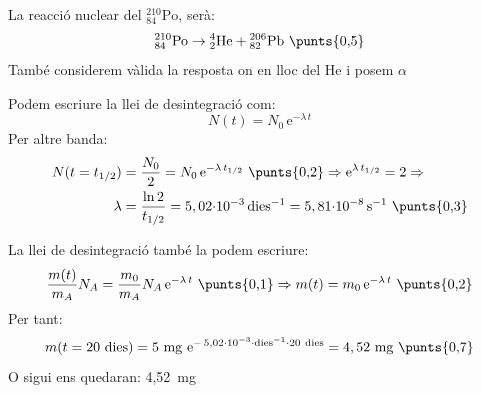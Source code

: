 \begin{solapartat}
La reacció nuclear del ${}^{210}_{84}\mathrm{Po}$, serà:
\[ {}^{210}_{84}\mathrm{Po} \rightarrow {}^{4}_{2}\mathrm{He} + {}^{206}_{82}\mathrm{Pb}\ \text{\punts{0,5}} \]
També considerem vàlida la resposta on en lloc del He i posem $\alpha$

Podem escriure la llei de desintegració com:
\[ N(t) = N_0\,\mathrm{e}^{-\lambda\,t} \]
Per altre banda:
\begin{align*}
N(t = t_{1/2}) &= \frac{N_0}{2} = N_0\,\mathrm{e}^{-\lambda\,t_{1/2}}\ \text{\punts{0,2}} \Rightarrow \mathrm{e}^{\lambda\,t_{1/2}} = 2 \Rightarrow\\
\lambda &= \frac{\ln 2}{t_{1/2}} = 5,02{\cdot}10^{-3}\,\mathrm{dies^{-1}} = 5,81{\cdot}10^{-8}\,\mathrm{s^{-1}}\ \text{\punts{0,3}}
\end{align*}
\end{solapartat}

\begin{solapartat}
La llei de desintegració també la podem escriure:
\[ \frac{m(t)}{m_A}N_A = \frac{m_0}{m_A}N_A\,\mathrm{e}^{-\lambda\,t}\ \text{\punts{0,1}} \Rightarrow m(t) = m_0\,\mathrm{e}^{-\lambda\,t}\ \text{\punts{0,2}} \]
Per tant:
\[ m(t = 20\ \text{dies}) = 5\ \mathrm{mg}\ \mathrm{e}^{-\,5,02\cdot 10^{-3}\cdot\mathrm{dies}^{-1}\cdot 20\ \mathrm{dies}} = 4,52\ \mathrm{mg}\ \text{\punts{0,7}} \]
O sigui ens quedaran: 4,52~mg
\end{solapartat}
